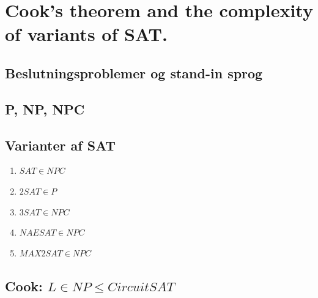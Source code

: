 \documentclass{article}
\begin{document}
\section{Cook's theorem and the complexity of variants of SAT.}

\subsection{Beslutningsproblemer og stand-in sprog}
\subsection{P, NP, NPC}
\subsection{Varianter af SAT}
\begin{enumerate}
    \item $SAT \in NPC$
    \item $2SAT \in P$
    \item $3SAT \in NPC$
    \item $NAESAT \in NPC$
    \item $MAX2SAT \in NPC$
\end{enumerate}
\subsection{Cook: $L \in NP \le Circuit SAT$}
\end{document}
